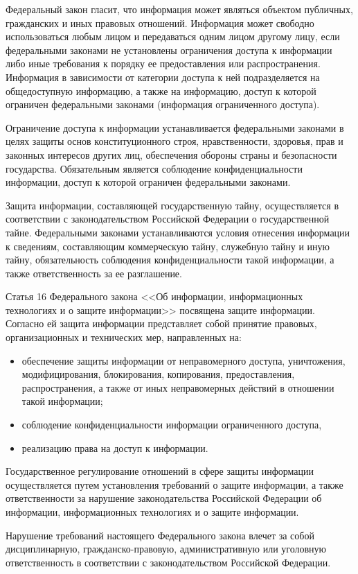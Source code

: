 Федеральный закон гласит, что информация может являться объектом публичных, гражданских и иных правовых отношений. Информация может свободно использоваться любым лицом и передаваться одним лицом другому лицу, если федеральными законами не установлены ограничения доступа к информации либо иные требования к порядку ее предоставления или распространения. Информация в зависимости от категории доступа к ней подразделяется на общедоступную информацию, а также на информацию, доступ к которой ограничен федеральными законами (информация ограниченного доступа).

\vspace{\baselineskip}
Ограничение доступа к информации устанавливается федеральными законами в целях защиты основ конституционного строя, нравственности, здоровья, прав и законных интересов других лиц, обеспечения обороны страны и безопасности государства. Обязательным является соблюдение конфиденциальности информации, доступ к которой ограничен федеральными законами.

\vspace{\baselineskip}
Защита информации, составляющей государственную тайну, осуществляется в соответствии с законодательством Российской Федерации о государственной тайне. Федеральными законами устанавливаются условия отнесения информации к сведениям, составляющим коммерческую тайну, служебную тайну и иную тайну, обязательность соблюдения конфиденциальности такой информации, а также ответственность за ее разглашение.

\vspace{\baselineskip}
Статья 16 Федерального закона <<Об информации, информационных технологиях и о защите информации>> посвящена защите информации. Согласно ей защита информации представляет собой принятие правовых, организационных и технических мер, направленных на:
\begin{itemize}
	\item обеспечение защиты информации от неправомерного доступа, уничтожения, модифицирования, блокирования, копирования, предоставления, распространения, а также от иных неправомерных действий в отношении такой информации;
	\item соблюдение конфиденциальности информации ограниченного доступа,
	\item реализацию права на доступ к информации.
\end{itemize}

Государственное регулирование отношений в сфере защиты информации осуществляется путем установления требований о защите информации, а также ответственности за нарушение законодательства Российской Федерации об информации, информационных технологиях и о защите информации. 

\vspace{\baselineskip}
Нарушение требований настоящего Федерального закона влечет за собой дисциплинарную, гражданско-правовую, административную или уголовную ответственность в соответствии с законодательством Российской Федерации.